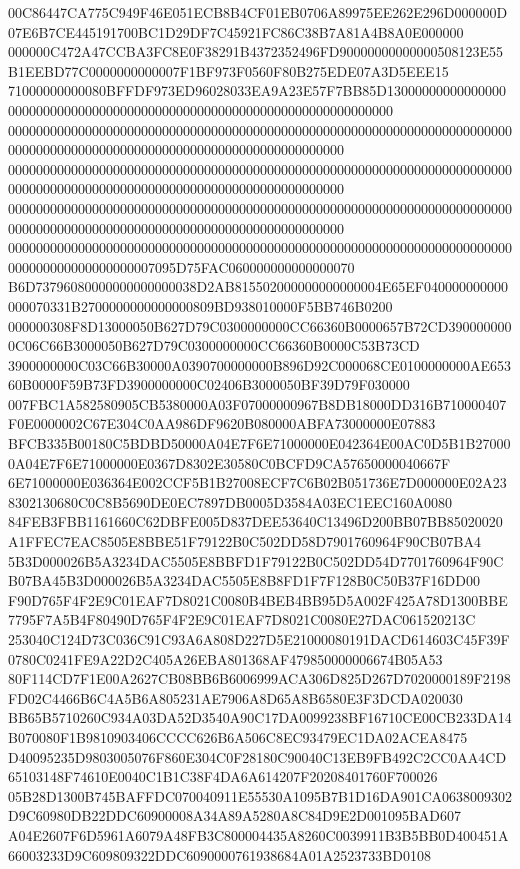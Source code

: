 \documentclass[UTF8,fontset=fandol,zihao=-4,a4paper]{ctexart}
\begin{document}
{{00C86447CA775C949F46E051ECB8B4CF01EB0706A89975EE262E296D000000D07E6B7CE445191700BC1D29DF7C45921FC86C38B7A81A4B8A0E000000
000000C472A47CCBA3FC8E0F38291B4372352496FD90000000000000508123E55B1EEBD77C0000000000007F1BF973F0560F80B275EDE07A3D5EEE15
71000000000080BFFDF973ED96028033EA9A23E57F7BB85D130000000000000000000000000000000000000000000000000000000000000000000000
000000000000000000000000000000000000000000000000000000000000000000000000000000000000000000000000000000000000000000000000
000000000000000000000000000000000000000000000000000000000000000000000000000000000000000000000000000000000000000000000000
000000000000000000000000000000000000000000000000000000000000000000000000000000000000000000000000000000000000000000000000
000000000000000000000000000000000000000000000000000000000000000000000000000000000000000000007095D75FAC060000000000000070
B6D73796080000000000000038D2AB815502000000000000004E65EF040000000000000070331B2700000000000000809BD938010000F5BB746B0200
000000308F8D13000050B627D79C0300000000CC66360B0000657B72CD3900000000C06C66B3000050B627D79C0300000000CC66360B0000C53B73CD
3900000000C03C66B30000A0390700000000B896D92C000068CE0100000000AE65360B0000F59B73FD3900000000C02406B3000050BF39D79F030000
007FBC1A582580905CB5380000A03F07000000967B8DB18000DD316B710000407F0E0000002C67E304C0AA986DF9620B080000ABFA73000000E07883
BFCB335B00180C5BDBD50000A04E7F6E71000000E042364E00AC0D5B1B270000A04E7F6E71000000E0367D8302E30580C0BCFD9CA57650000040667F
6E71000000E036364E002CCF5B1B27008ECF7C6B02B051736E7D000000E02A238302130680C0C8B5690DE0EC7897DB0005D3584A03EC1EEC160A0080
84FEB3FBB1161660C62DBFE005D837DEE53640C13496D200BB07BB85020020A1FFEC7EAC8505E8BBE51F79122B0C502DD58D7901760964F90CB07BA4
5B3D000026B5A3234DAC5505E8BBFD1F79122B0C502DD54D7701760964F90CB07BA45B3D000026B5A3234DAC5505E8B8FD1F7F128B0C50B37F16DD00
F90D765F4F2E9C01EAF7D8021C0080B4BEB4BB95D5A002F425A78D1300BBE7795F7A5B4F80490D765F4F2E9C01EAF7D8021C0080E27DAC061520213C
253040C124D73C036C91C93A6A808D227D5E21000080191DACD614603C45F39F0780C0241FE9A22D2C405A26EBA801368AF479850000006674B05A53
80F114CD7F1E00A2627CB08BB6B6006999ACA306D825D267D7020000189F2198FD02C4466B6C4A5B6A805231AE7906A8D65A8B6580E3F3DCDA020030
BB65B5710260C934A03DA52D3540A90C17DA0099238BF16710CE00CB233DA14B070080F1B9810903406CCCC626B6A506C8EC93479EC1DA02ACEA8475
D40095235D9803005076F860E304C0F28180C90040C13EB9FB492C2CC0AA4CD65103148F74610E0040C1B1C38F4DA6A614207F20208401760F700026
05B28D1300B745BAFFDC070040911E55530A1095B7B1D16DA901CA0638009302D9C60980DB22DDC60900008A34A89A5280A8C84D9E2D001095BAD607
A04E2607F6D5961A6079A48FB3C800004435A8260C0039911B3B5BB0D400451A66003233D9C609809322DDC6090000761938684A01A2523733BD0108
}}
\end{document}
